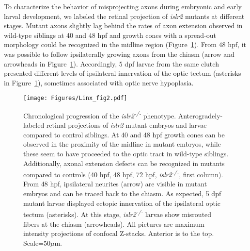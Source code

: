 To characterize the behavior of misprojecting axons during embryonic and early larval development, we labeled the retinal projection of \emph{islr2} mutants at different stages.
Mutant axons slightly lag behind the rates of axon extension observed in wild-type siblings at 40 and 48 hpf and growth cones with a spread-out morphology could be recognized in the midline region (Figure~\ref{Linxfig2}).
From 48 hpf, it was possible to follow ipsilaterally growing axons from the chiasm (arrow and arrowheads in Figure~\ref{Linxfig2}).
Accordingly, 5 dpf larvae from the same clutch presented different levels of ipsilateral innervation of the optic tectum (asterisks in Figure~\ref{Linxfig2}), sometimes associated with optic nerve hypoplasia.
\begin{figure}[hbtp]
    \begin{center}
        \texttt{[image: Figures/Linx\_fig2.pdf]}
        \caption[Chronological progression of the \emph{islr2\textsuperscript{-/-}} phenotype.]
        {Chronological progression of the \emph{islr2\textsuperscript{-/-}} phenotype.
		Anterogradely-labeled retinal projections of \emph{islr2} mutant embryos and larvae compared to control siblings.
		At 40 and 48 hpf growth cones can be observed in the proximity of the midline in mutant embryos, while these seem to have proceeded to the optic tract in wild-type siblings.
		Additionally, axonal extension defects can be recognized in mutants compared to controls (40 hpf, 48 hpf, 72 hpf, \emph{islr2\textsuperscript{-/-}}, first column).
		From 48 hpf, ipsilateral neurites (arrow) are visible in mutant embryos and can be traced back to the chiasm.
		As expected, 5 dpf mutant larvae displayed ectopic innervation of the ipsilateral optic tectum (asterisks).
		At this stage, \emph{islr2\textsuperscript{-/-}} larvae show misrouted fibers at the chiasm (arrowheads).
		All pictures are maximum intensity projections of confocal Z-stacks.
		Anterior is to the top.
		Scale=50$\mu$m.
		}
        \label{Linxfig2}
    \end{center}
\end{figure}

